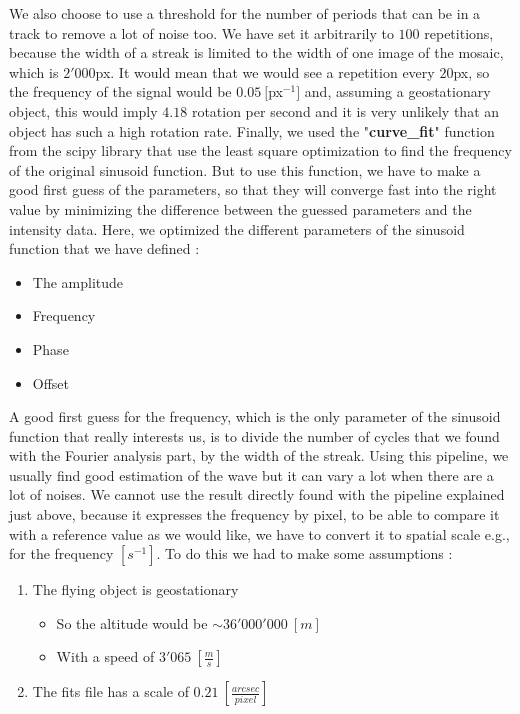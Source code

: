 \documentclass[a4paper,12pt,oneside]{report}
\begin{document}
We also choose to use a threshold for the number of periods that can be in a track to remove a lot of noise too. 
We have set it arbitrarily to $100$ repetitions, because the width of a streak is limited to the width of one image of the mosaic, which is 
$2'000$px. It would mean that we would see a repetition every $20$px, so the frequency of the signal would be $0.05\ [$px$^{-1}]$ and,
assuming a geostationary object, this would imply $4.18$ rotation per second and it is very unlikely that an object has such a high 
rotation rate.
\newline
\newline
Finally, we used the "\textbf{curve\_fit}" function from the scipy library that use the least square optimization \cite{leastSquare} to find the frequency of the
original sinusoid function. But to use this function, we have to make a good first guess of the parameters, so that they will converge 
fast into the right value by minimizing the difference between the guessed parameters and the intensity data. Here, we optimized the 
different parameters of the sinusoid function that we have defined :
\begin{itemize}
    \item The amplitude
    \item Frequency
    \item Phase
    \item Offset
\end{itemize}
A good first guess for the frequency, which is the only parameter of the sinusoid function that really interests us, is to 
divide the number of cycles that we found with the Fourier analysis part, by the width of the streak. 
\newline
Using this pipeline, we usually find good estimation of the wave but it can vary a lot when there are a lot of noises.
\newline
\newline
We cannot use the result directly found with the pipeline explained just above, because it expresses the frequency by pixel, to be able to
compare it with a reference value as we would like, we have to convert it to spatial scale e.g., for the frequency $[s^{-1}]$. To do this
we had to make some assumptions : 
\begin{enumerate}
    \item The flying object is geostationary
    \begin{itemize}
    \item So the altitude would be $\sim 36'000'000\ [m]$
    \item With a speed of $3'065\ [\frac{m}{s}]$
    \end{itemize}
    \item The fits file has a scale of $0.21\ [\frac{arcsec}{pixel}]$
\end{enumerate}
\end{document}
